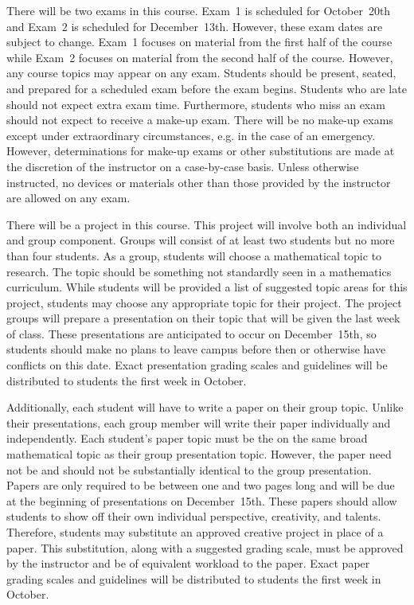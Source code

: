 \documentclass[11pt,letterpaper]{article}
\begin{document}
There will be two exams in this course. Exam~1 is scheduled for October~20th and Exam~2 is scheduled for December~13th. However, these exam dates are subject to change. Exam~1 focuses on material from the first half of the course while Exam~2 focuses on material from the second half of the course. However, any course topics may appear on any exam. Students should be present, seated, and prepared for a scheduled exam before the exam begins. Students who are late should not expect extra exam time. Furthermore, students who miss an exam should not expect to receive a make-up exam. There will be no make-up exams except under extraordinary circumstances, e.g. in the case of an emergency. However, determinations for make-up exams or other substitutions are made at the discretion of the instructor on a case-by-case basis. Unless otherwise instructed, no devices or materials other than those provided by the instructor are allowed on any exam. 
\sectionbreak



There will be a project in this course. This project will involve both an individual and group component. Groups will consist of at least two students but no more than four students. As a group, students will choose a mathematical topic to research. The topic should be something not standardly seen in a mathematics curriculum. While students will be provided a list of suggested topic areas for this project, students may choose any appropriate topic for their project. The project groups will prepare a presentation on their topic that will be given the last week of class. These presentations are anticipated to occur on December~15th, so students should make no plans to leave campus before then or otherwise have conflicts on this date. Exact presentation grading scales and guidelines will be distributed to students the first week in October. \pspace

Additionally, each student will have to write a paper on their group topic. Unlike their presentations, each group member will write their paper individually and independently. Each student's paper topic must be the on the same broad mathematical topic as their group presentation topic. However, the paper need not be and should not be substantially identical to the group presentation. Papers are only required to be between one and two pages long and will be due at the beginning of presentations on December~15th. These papers should allow students to show off their own individual perspective, creativity, and talents. Therefore, students may substitute an approved creative project in place of a paper. This substitution, along with a suggested grading scale, must be approved by the instructor and be of equivalent workload to the paper. Exact paper grading scales and guidelines will be distributed to students the first week in October. 
\sectionbreak
 
\end{document}
